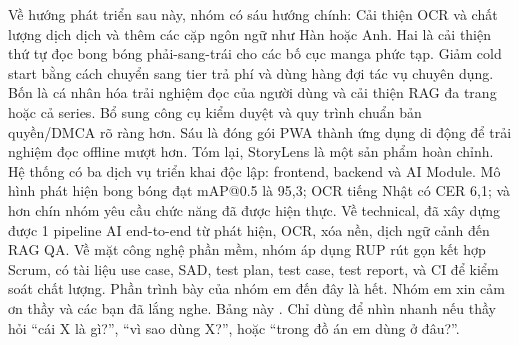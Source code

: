 {}
\markdownRendererSectionEnd \markdownRendererSectionBegin
{}\markdownRendererInterblockSeparator
{}Về hướng phát triển sau này, nhóm có sáu hướng chính:\markdownRendererParagraphSeparator
{}Cải thiện OCR và chất lượng dịch dịch và thêm các cặp ngôn ngữ như Hàn hoặc Anh.\markdownRendererParagraphSeparator
{}Hai là cải thiện thứ tự đọc bong bóng phải-sang-trái cho các bố cục manga phức tạp.\markdownRendererParagraphSeparator
{}Giảm cold start bằng cách chuyển sang tier trả phí và dùng hàng đợi tác vụ chuyên dụng.\markdownRendererParagraphSeparator
{}Bốn là cá nhân hóa trải nghiệm đọc của người dùng và cải thiện RAG đa trang hoặc cả series.\markdownRendererParagraphSeparator
{}Bổ sung công cụ kiểm duyệt và quy trình chuẩn bản quyền/DMCA rõ ràng hơn.\markdownRendererParagraphSeparator
{}Sáu là đóng gói PWA thành ứng dụng di động để trải nghiệm đọc offline mượt hơn.\markdownRendererInterblockSeparator
{}
\markdownRendererSectionEnd \markdownRendererSectionBegin
{}\markdownRendererInterblockSeparator
{}Tóm lại, StoryLens là một sản phẩm hoàn chỉnh.\markdownRendererParagraphSeparator
{}Hệ thống có ba dịch vụ triển khai độc lập: frontend, backend và AI Module. Mô hình phát hiện bong bóng đạt mAP@0.5 là 95,3\markdownRendererPercentSign{}; OCR tiếng Nhật có CER 6,1\markdownRendererPercentSign{}; và hơn chín nhóm yêu cầu chức năng đã được hiện thực.\markdownRendererParagraphSeparator
{}Về technical, đã xây dựng được 1 pipeline AI end-to-end từ phát hiện, OCR, xóa nền, dịch ngữ cảnh đến RAG Q\markdownRendererAmpersand{}A.\markdownRendererParagraphSeparator
{}Về mặt công nghệ phần mềm, nhóm áp dụng RUP rút gọn kết hợp Scrum, có tài liệu use case, SAD, test plan, test case, test report, và CI để kiểm soát chất lượng.\markdownRendererInterblockSeparator
{}
\markdownRendererSectionEnd \markdownRendererSectionBegin
{}\markdownRendererInterblockSeparator
{}Phần trình bày của nhóm em đến đây là hết. Nhóm em xin cảm ơn thầy và các bạn đã lắng nghe.\markdownRendererInterblockSeparator
{}\markdownRendererThematicBreak{}\markdownRendererInterblockSeparator
{}
\markdownRendererSectionEnd 
\markdownRendererSectionEnd \markdownRendererSectionBegin
{}\markdownRendererInterblockSeparator
{}Bảng này . Chỉ dùng để nhìn nhanh nếu thầy hỏi “cái X là gì?”, “vì sao dùng X?”, hoặc “trong đồ án em dùng ở đâu?”.\markdownRendererInterblockSeparator
